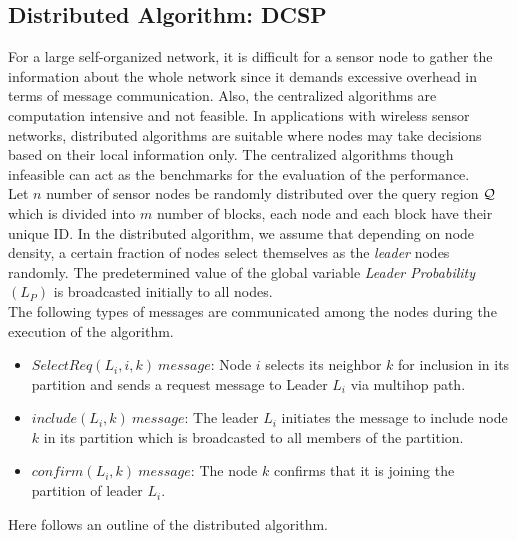 \documentclass{acm_proc_article-sp}
\begin{document}
\subsection{\bf Distributed Algorithm: DCSP}
For a large self-organized network, it is difficult for a sensor node to gather the information about the whole network since it demands excessive overhead in terms of message communication. Also, the centralized algorithms are computation intensive and not feasible. In applications with wireless sensor networks, distributed algorithms are suitable where nodes may take decisions based on their local information only. The centralized algorithms though infeasible can act as the benchmarks for the evaluation of the performance.\\
Let $n$ number of sensor nodes be randomly distributed over the query region ${\cal Q}$ which is divided into $m$ number of blocks, each node and each block have their unique ID. In the distributed algorithm, we assume that depending on node density, a certain fraction of nodes select themselves as the {\it leader} nodes randomly. The predetermined value of the global variable {\it Leader Probability} $(L_P)$ is broadcasted initially to all nodes.\\
The following types of messages are communicated among the nodes during the execution of the algorithm. 
\vspace{-0.5cm}
\begin{itemize}
\item $SelectReq(L_i, i, k)\ message$: Node $i$ selects its neighbor $k$ for inclusion in its partition and sends a request message to Leader $L_i$ via multihop path.
\item $include(L_i, k)\ message$: The leader $L_i$ initiates the message to include node $k$ in its partition which is broadcasted to all members of the partition.
\item $confirm(L_i, k)\ message$: The node $k$ confirms that it is joining the partition of leader $L_i$.
\end{itemize}
\vspace{-0.5cm}
 Here follows an outline of the distributed algorithm.
\end{document}
